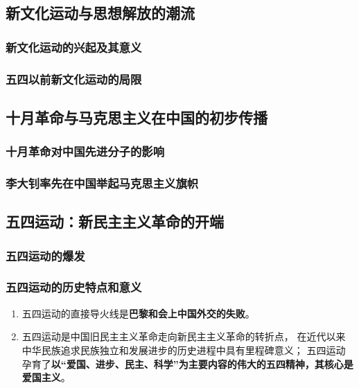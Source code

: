 \documentclass[10pt, UTF8]{ctexbook} %
\begin{document}
\subsection{新文化运动与思想解放的潮流}

\subsubsection{新文化运动的兴起及其意义}
\subsubsection{五四以前新文化运动的局限}

\subsection{十月革命与马克思主义在中国的初步传播}

\subsubsection{十月革命对中国先进分子的影响}
\subsubsection{李大钊率先在中国举起马克思主义旗帜}




\subsection{五四运动：新民主主义革命的开端}

\subsubsection{五四运动的爆发}
\subsubsection{五四运动的历史特点和意义}


\begin{mdframed}[frametitle={五四运动：中国新民主主义革命的开端}]
    \begin{enumerate}[itemsep=0pt]
        \item 五四运动的直接导火线是\textbf{巴黎和会上中国外交的失败}。
        \item 五四运动是中国旧民主主义革命走向新民主主义革命的转折点，
        在近代以来中华民族追求民族独立和发展进步的历史进程中具有里程碑意义；
        五四运动孕育了\textbf{以“爱国、进步、民主、科学”为主要内容的伟大的五四精神，其核心是爱国主义}。
    \end{enumerate}
\end{mdframed}
\end{document}
